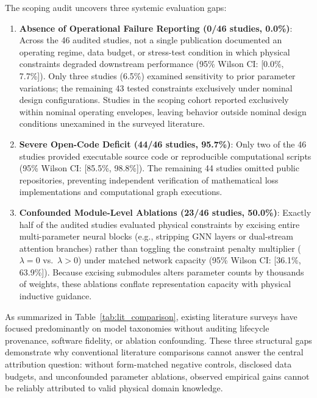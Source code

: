 The scoping audit uncovers three systemic evaluation gaps:
\begin{enumerate}[leftmargin=*]
\item \textbf{Absence of Operational Failure Reporting (0/46 studies, 0.0\%)}: Across the 46 audited studies, not a single publication documented an operating regime, data budget, or stress-test condition in which physical constraints degraded downstream performance (95\% Wilson CI: [0.0\%, 7.7\%]). Only three studies (6.5\%) examined sensitivity to prior parameter variations; the remaining 43 tested constraints exclusively under nominal design configurations. Studies in the scoping cohort reported exclusively within nominal operating envelopes, leaving behavior outside nominal design conditions unexamined in the surveyed literature.
\item \textbf{Severe Open-Code Deficit (44/46 studies, 95.7\%)}: Only two of the 46 studies provided executable source code or reproducible computational scripts (95\% Wilson CI: [85.5\%, 98.8\%]). The remaining 44 studies omitted public repositories, preventing independent verification of mathematical loss implementations and computational graph executions.
\item \textbf{Confounded Module-Level Ablations (23/46 studies, 50.0\%)}: Exactly half of the audited studies evaluated physical constraints by excising entire multi-parameter neural blocks (e.g., stripping GNN layers or dual-stream attention branches) rather than toggling the constraint penalty multiplier ($\lambda=0$ vs.\ $\lambda>0$) under matched network capacity (95\% Wilson CI: [36.1\%, 63.9\%]). Because excising submodules alters parameter counts by thousands of weights, these ablations conflate representation capacity with physical inductive guidance.
\end{enumerate}

As summarized in Table~\ref{tab:lit_comparison}, existing literature surveys have focused predominantly on model taxonomies without auditing lifecycle provenance, software fidelity, or ablation confounding. These three structural gaps demonstrate why conventional literature comparisons cannot answer the central attribution question: without form-matched negative controls, disclosed data budgets, and unconfounded parameter ablations, observed empirical gains cannot be reliably attributed to valid physical domain knowledge.
